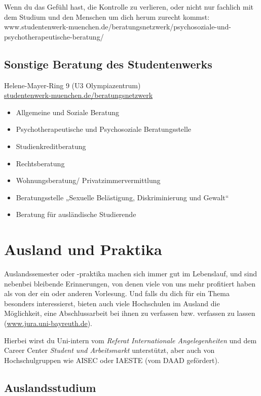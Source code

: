 \documentclass[twoside,12pt,parskip=half-]{scrartcl}
\begin{document}
Wenn du das Gefühl hast, die Kontrolle zu verlieren, oder nicht nur fachlich mit
dem Studium und den Menschen um dich herum zurecht kommst:\\
www.studentenwerk-muenchen.de/beratungsnetzwerk/psychosoziale-und\newline -psychotherapeutische-beratung/


\subsection{Sonstige Beratung des Studentenwerks}
Helene-Mayer-Ring 9 (U3 Olympiazentrum)\\
\url{studentenwerk-muenchen.de/beratungsnetzwerk}

\begin{itemize}
	\item Allgemeine und Soziale Beratung
	\item Psychotherapeutische und Psychosoziale Beratungsstelle
	\item Studienkreditberatung
	\item Rechtsberatung
	\item Wohnungsberatung/ Privatzimmervermittlung
	\item Beratungsstelle „Sexuelle Belästigung, Diskriminierung und Gewalt“
	\item Beratung für ausländische Studierende
\end{itemize}



\clearpage

\section{Ausland und Praktika}

Auslandssemester oder -praktika machen sich immer gut im Lebenslauf,
und sind nebenbei bleibende Erinnerungen, von denen viele von uns mehr
profitiert haben als von der ein oder anderen Vorlesung.  Und falls du
dich für ein Thema besonders interessierst, bieten auch viele
Hochschulen im Ausland die Möglichkeit, eine Abschlussarbeit bei ihnen
zu verfassen bzw. verfassen zu lassen (\url{www.jura.uni-bayreuth.de}).

Hierbei wirst du Uni-intern vom \emph{Referat Internationale Angelegenheiten} und dem Career Center \emph{Student und Arbeitsmarkt} unterstützt, aber auch von Hochschulgruppen wie AISEC oder IAESTE (vom DAAD gefördert).

\subsection{Auslandsstudium}
\end{document}

